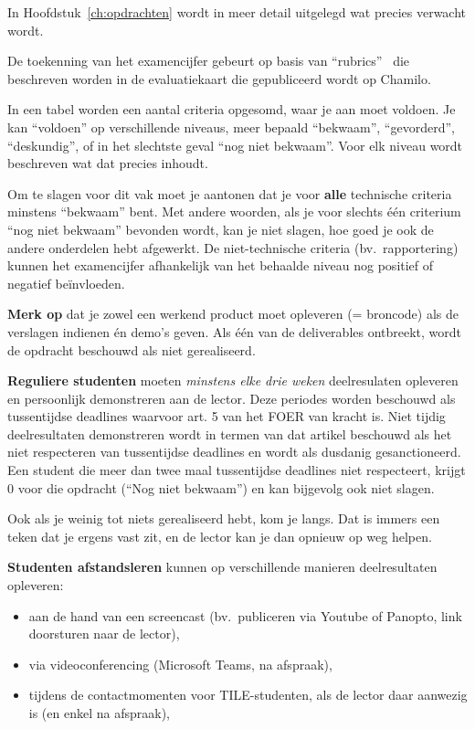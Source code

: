 In Hoofdstuk~\ref{ch:opdrachten} wordt in meer detail uitgelegd wat precies verwacht wordt.

De toekenning van het examencijfer gebeurt op basis van ``rubrics''~\autocite{Andrade2000} die beschreven worden in de evaluatiekaart die gepubliceerd wordt op Chamilo.

In een tabel worden een aantal criteria opgesomd, waar je aan moet voldoen. Je kan ``voldoen'' op verschillende niveaus, meer bepaald ``bekwaam'', ``gevorderd'', ``deskundig'', of in het slechtste geval ``nog niet bekwaam''. Voor elk niveau wordt beschreven wat dat precies inhoudt.

Om te slagen voor dit vak moet je aantonen dat je voor \textbf{alle} technische criteria minstens ``bekwaam'' bent. Met andere woorden, als je voor slechts één criterium ``nog niet bekwaam'' bevonden wordt, kan je niet slagen, hoe goed je ook de andere onderdelen hebt afgewerkt. De niet-technische criteria (bv.\ rapportering) kunnen het examencijfer afhankelijk van het behaalde niveau nog positief of negatief beïnvloeden.

\textbf{Merk op} dat je zowel een werkend product moet opleveren (= broncode) als de verslagen indienen én demo's geven. Als één van de deliverables ontbreekt, wordt de opdracht beschouwd als niet gerealiseerd.

\textbf{Reguliere studenten} moeten \emph{minstens elke drie weken} deelresulaten opleveren en persoonlijk demonstreren aan de lector. Deze periodes worden beschouwd als tussentijdse deadlines waarvoor art. 5 van het FOER van kracht is. Niet tijdig deelresultaten demonstreren wordt in termen van dat artikel beschouwd als het niet respecteren van tussentijdse deadlines en wordt als dusdanig gesanctioneerd. Een student die meer dan twee maal tussentijdse deadlines niet respecteert, krijgt 0 voor die opdracht (``Nog niet bekwaam'') en kan bijgevolg ook niet slagen.

Ook als je weinig tot niets gerealiseerd hebt, kom je langs. Dat is immers een teken dat je ergens vast zit, en de lector kan je dan opnieuw op weg helpen.

\textbf{Studenten afstandsleren} kunnen op verschillende manieren deelresultaten opleveren:

\begin{itemize}
  \item aan de hand van een screencast (bv.\ publiceren via Youtube of Panopto, link doorsturen naar de lector),
  \item via videoconferencing (Microsoft Teams, na afspraak),
  \item tijdens de contactmomenten voor TILE-studenten, als de lector daar aanwezig is (en enkel na afspraak),
\end{itemize}


